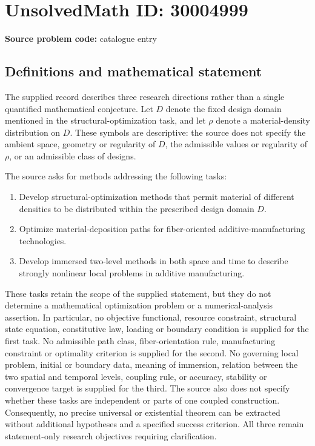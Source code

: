 \documentclass[11pt]{article}
\begin{document}
\section*{UnsolvedMath ID: 30004999}
\textbf{Source problem code:} catalogue entry
\subsection{Definitions and mathematical statement}
The supplied record describes three research directions rather than a single quantified mathematical conjecture. Let \(D\) denote the fixed design domain mentioned in the structural-optimization task, and let \(\rho\) denote a material-density distribution on \(D\). These symbols are descriptive: the source does not specify the ambient space, geometry or regularity of \(D\), the admissible values or regularity of \(\rho\), or an admissible class of designs.

The source asks for methods addressing the following tasks:
\begin{enumerate}
\item Develop structural-optimization methods that permit material of different densities to be distributed within the prescribed design domain \(D\).
\item Optimize material-deposition paths for fiber-oriented additive-manufacturing technologies.
\item Develop immersed two-level methods in both space and time to describe strongly nonlinear local problems in additive manufacturing.
\end{enumerate}

These tasks retain the scope of the supplied statement, but they do not determine a mathematical optimization problem or a numerical-analysis assertion. In particular, no objective functional, resource constraint, structural state equation, constitutive law, loading or boundary condition is supplied for the first task. No admissible path class, fiber-orientation rule, manufacturing constraint or optimality criterion is supplied for the second. No governing local problem, initial or boundary data, meaning of immersion, relation between the two spatial and temporal levels, coupling rule, or accuracy, stability or convergence target is supplied for the third. The source also does not specify whether these tasks are independent or parts of one coupled construction. Consequently, no precise universal or existential theorem can be extracted without additional hypotheses and a specified success criterion. All three remain statement-only research objectives requiring clarification.
\end{document}
